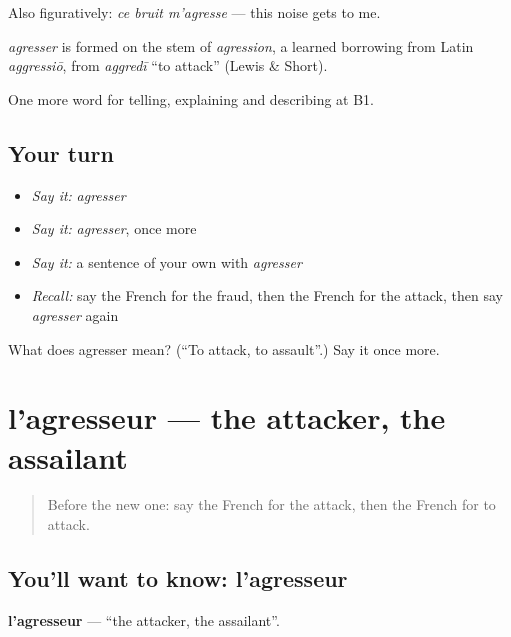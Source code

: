 Also figuratively: \emph{ce bruit m'agresse} — this noise gets to me.

\begin{cousinweb}
\emph{agresser} is formed on the stem of \emph{agression}, a learned borrowing from Latin \emph{aggressiō}, from \emph{aggredī} \textquotedblleft{}to attack\textquotedblright{} (Lewis \& Short).
\end{cousinweb}

\begin{grammarlens}[title={What you've built}]
One more word for telling, explaining and describing at B1.
\end{grammarlens}

\subsection*{Your turn}
\begin{itemize}
\raggedright
  \item \emph{Say it:} \emph{agresser}
  \item \emph{Say it:} \emph{agresser}, once more
  \item \emph{Say it:} a sentence of your own with \emph{agresser}
  \item \emph{Recall:} say the French for the fraud, then the French for the attack, then say \emph{agresser} again
\end{itemize}

\begin{tcolorbox}[breakable,colback=teal!4,colframe=teal!35!black,title={Before you move on}]
What does agresser mean? (\textquotedblleft{}To attack, to assault\textquotedblright{}.) Say it once more.
\end{tcolorbox}
\section[l'agresseur]{l'agresseur — the attacker, the assailant}

\label{lesson:FR-C289-agresseur}



\begin{quote}
Before the new one: say the French for the attack, then the French for to attack.
\end{quote}

\subsection*{You'll want to know: l'agresseur}
\textbf{l'agresseur} — \textquotedblleft{}the attacker, the assailant\textquotedblright{}.

